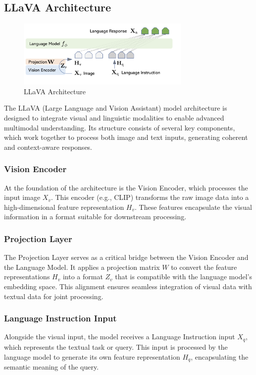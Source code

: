 \documentclass[12pt, conference, compsoc, onecolumn]{IEEEtran}
\begin{document}
	\subsection{LLaVA Architecture}
	\begin{figure}[H]
		\centering
		\includegraphics[width=0.75\textwidth]{figures/conceptual-diagram-of-llava.png}
		\caption{LLaVA Architecture \cite{liu2023llava}}
		\label{fig:llava_arch}
	\end{figure}
	
	The LLaVA (Large Language and Vision Assistant) model architecture is designed to integrate visual and linguistic modalities to enable advanced multimodal understanding. Its structure consists of several key components, which work together to process both image and text inputs, generating coherent and context-aware responses.
	\subsubsection*{Vision Encoder} 
	At the foundation of the architecture is the Vision Encoder, which processes the input image $X_v$. This encoder (e.g., CLIP) transforms the raw image data into a high-dimensional feature representation $H_v$. These features encapsulate the visual information in a format suitable for downstream processing.
	
	\subsubsection*{Projection Layer} 
	The Projection Layer serves as a critical bridge between the Vision Encoder and the Language Model. It applies a projection matrix $W$ to convert the feature representations $H_v$ into a format $Z_v$ that is compatible with the language model's embedding space. This alignment ensures seamless integration of visual data with textual data for joint processing.
	
	\subsubsection*{Language Instruction Input}
	Alongside the visual input, the model receives a Language Instruction input $X_q$, which represents the textual task or query. This input is processed by the language model to generate its own feature representation $H_q$, encapsulating the semantic meaning of the query.
	
\end{document}
